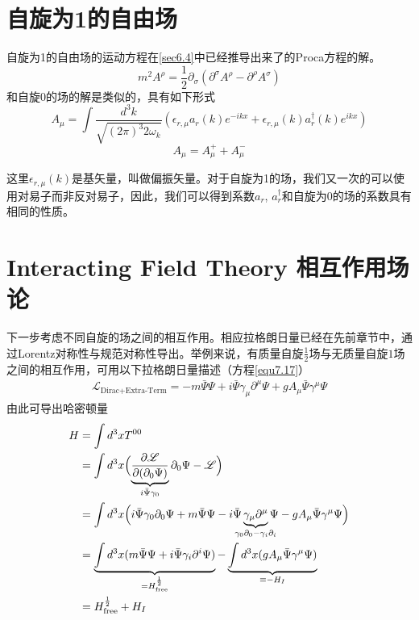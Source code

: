 \section{自旋为1的自由场}
\label{sec9.4}
自旋为1的自由场的运动方程在\ref{sec6.4}中已经推导出来了的Proca方程的解。
\begin{equation} \label{equ9.42}
m^{2}A^{\rho}=\frac{1}{2}\partial_{\sigma}(\partial^{\sigma}A^{\rho}-\partial^{\rho}A^{\sigma})
\end{equation}
和自旋0的场的解是类似的，具有如下形式
\begin{equation} \label{equ9.43}
A_{\mu} = \int \frac{d^{3}k}{ \sqrt{(2\pi)^{3}2\omega_{k}}}(\epsilon_{r,\mu}a_{r}(k)e^{-ikx}+\epsilon_{r,\mu}(k)a_{r}^{\dagger}(k)e^{ikx})
\end{equation}
\begin{equation} \label{equ9.44}
A_{\mu}=A^{+}_{\mu}+A^{-}_{\mu}
\end{equation}

这里$\epsilon_{r,\mu}(k)$是基矢量，叫做偏振矢量。对于自旋为1的场，我们又一次的可以使用对易子而非反对易子，因此，我们可以得到系数$a_{r}$, $a_{r}^{\dagger}$和自旋为0的场的系数具有相同的性质。

\section{Interacting Field Theory 相互作用场论}\label{sec9.5}
下一步考虑不同自旋的场之间的相互作用。相应拉格朗日量已经在先前章节中，通过Lorentz对称性与规范对称性导出。举例来说，有质量自旋$\frac{1}{2}$场与无质量自旋$1$场之间的相互作用，可用以下拉格朗日量描述（方程\ref{equ7.17}）
\begin{align}\label{equ9.45}
\mathscr{L}_\text{Dirac+Extra-Term}=-m\bar{\Psi}\Psi+i\bar{\Psi}\gamma_\mu\partial^\mu\Psi+gA_\mu\bar{\Psi}\gamma^\mu\Psi
\end{align}
由此可导出哈密顿量
\begin{align}\label{equ9.46}
H&=\int{d^3x T^{00}}\nonumber\\
&=\int{d^3x\Bigl(\underbrace{\frac{\partial\mathscr{L}}{\partial(\partial_0\Psi)} }_{i\bar{\Psi}\gamma_0}\partial_0\Psi-\mathscr{L} \Bigl)}\nonumber\\
&=\int d^3x\Bigl( i\bar{\Psi}\gamma_0\partial_0\Psi+m\bar{\Psi}\Psi-i\bar{\Psi}\underbrace{\gamma_\mu\partial^\mu}_{\mathclap{\gamma_0\partial_0-\gamma_i\partial_i}}\Psi-gA_\mu\bar{\Psi}\gamma^\mu\Psi \Bigl)\nonumber\\
&=\underbrace{\int d^3x( m\bar{\Psi}\Psi+i\bar{\Psi}\gamma_i\partial^i\Psi)}_{=H^{\frac{1}{2}}_\text{free}}- \underbrace{\int d^3x (gA_\mu\bar{\Psi}\gamma^\mu\Psi )}_{\equiv-H_I}\nonumber\\
&=H_\text{free}^{\frac{1}{2}}+H_I
\end{align}

